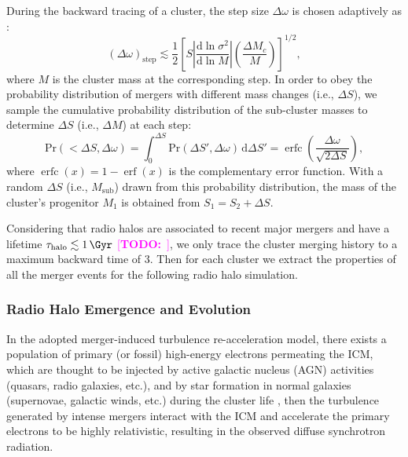 \documentclass[modern]{aastex62}
\newcommand{\R}[1]{\mathrm{#1}}
\newcommand{\D}[1]{\R{d} #1}
\newcommand{\diff}[2]{\frac{\D{#1}}{\D{#2}}}
\newcommand{\TODO}[1]{\textcolor{magenta}{[\textbf{TODO:}~\uuline{#1}]}}
\DeclareMathOperator{\erf}{erf}
\DeclareMathOperator{\erfc}{erfc}
\begin{document}
During the backward tracing of a cluster, the step size $\Delta\omega$
is chosen adaptively as \citep{randall2002}:
\begin{equation}
  \label{sec:dw-step}
  (\Delta\omega)_{\R{step}} \lesssim \frac{1}{2} \left[
    S \left| \diff{\ln \sigma^2}{\ln M} \right|
    \left( \frac{\Delta M_c}{M} \right) \right]^{1/2},
\end{equation}
where $M$ is the cluster mass at the corresponding step.
In order to obey the probability distribution of mergers with different
mass changes (i.e., $\Delta S$),
we sample the cumulative probability distribution of the sub-cluster masses
to determine $\Delta S$ (i.e., $\Delta M$) at each step:
\begin{equation}
  \label{sec:cdf-sub-masses}
  \R{Pr}(<\!\Delta S, \Delta\omega) =
  \int_0^{\Delta S} \R{Pr}(\Delta S', \Delta\omega) \,\D{\Delta S'} =
  \erfc \!\left( \frac{\Delta \omega}{\sqrt{2 \Delta S}} \right),
\end{equation}
where $\erfc(x) = 1 - \erf(x)$ is the complementary error function.
With a random $\Delta S$ (i.e., $M_{\R{sub}}$) drawn from this probability
distribution, the mass of the cluster's progenitor $M_1$ is obtained from
$S_1 = S_2 + \Delta S$.

Considering that radio halos are associated to recent major mergers and
have a lifetime $\tau_{\R{halo}} \lesssim \SI{1}{\Gyr}$
\citep{cassano2016} \TODO{change ref???},
we only trace the cluster merging history to a maximum backward time of
\SI{3}{\Gyr}.
Then for each cluster we extract the properties of all the merger events
for the following radio halo simulation.


\subsubsection{Radio Halo Emergence and Evolution}
\label{sec:halos}

In the adopted merger-induced turbulence re-acceleration model, there
exists a population of primary (or fossil) high-energy electrons permeating
the ICM, which are thought to be injected by active galactic nucleus (AGN)
activities (quasars, radio galaxies, etc.), and by star formation in
normal galaxies (supernovae, galactic winds, etc.) during the cluster
life \citep[see][for a review]{blasi2007rev},
then the turbulence generated by intense mergers interact with the ICM
and accelerate the primary electrons to be highly relativistic, resulting
in the observed diffuse synchrotron radiation.
\end{document}
